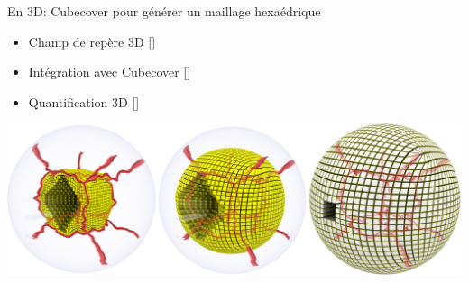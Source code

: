 \begin{frame}{En 3D: Cubecover pour générer un maillage hexaédrique}
    \begin{center}
		\begin{itemize}
			\item Champ de repère 3D [\cite{huang_boundary_2011}]
			\item Intégration avec Cubecover [\cite{nieser_cubecover_2011}]
			\item Quantification 3D [\cite{bruckler_volume_2022}]
		\end{itemize}
		\vspace{1em}
        \includegraphics[width=\linewidth]{img/cubecover/B34_graphe_interieur.PNG}
    \end{center}
\end{frame}
